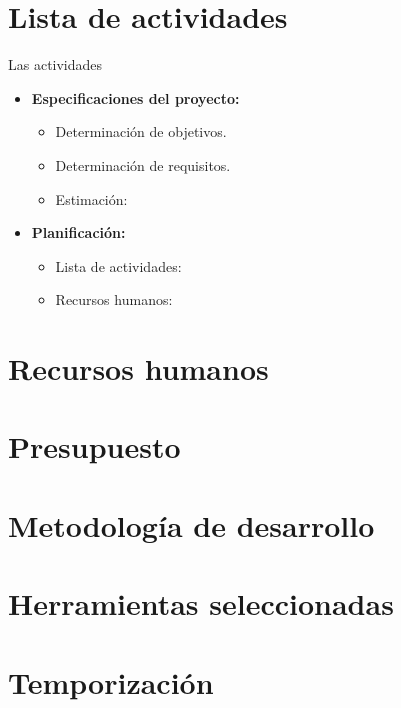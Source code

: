 \section{Lista de actividades}

Las actividades 

\begin{itemize}
   \item \textbf{Especificaciones del proyecto:}
   \begin{itemize}
    \item Determinación de objetivos.
    \item Determinación de requisitos.
    \item Estimación:
    \end{itemize}
\end{itemize}

\begin{itemize}
   \item \textbf{Planificación:}
   \begin{itemize}
    \item Lista de actividades:
    \item Recursos humanos:
   \end{itemize}
\end{itemize}



\section{Recursos humanos}

\section{Presupuesto}

\section{Metodología de desarrollo}

\section{Herramientas seleccionadas}

\section{Temporización}
